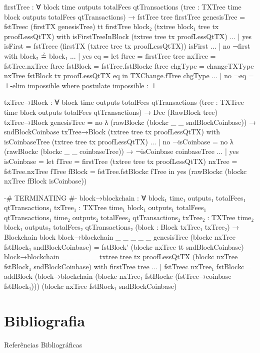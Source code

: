 \documentclass{beamer}
\begin{document}
\begin{code}
      firstTree : ∀
        {block time outputs totalFees qtTransactions}
        (tree : TXTree time block outputs totalFees qtTransactions)
        → fstTree tree
      firstTree genesisTree = fstTreec (firstTX genesisTree) tt
      firstTree {block₂} (txtree {block₁} tree tx proofLessQtTX)
        with isFirstTreeInBlock (txtree tree tx proofLessQtTX)
      ... | yes isFirst = fstTreec (firstTX (txtree tree tx proofLessQtTX)) isFirst
      ... | no ¬first with block₂ ≟ block₁
      ...   | yes eq = let ftree = firstTree tree
                           nxTree = fstTree.nxTree ftree
                           fstBlock = fstTree.fstBlockc ftree
                           chgType = changeTXType nxTree fstBlock tx proofLessQtTX eq
                       in TXChange.fTree chgType
      ...   | no ¬eq = ⊥-elim impossible
                where postulate impossible : ⊥

      txTree→Block : ∀
        {block time outputs totalFees qtTransactions}
        (tree : TXTree time block outputs totalFees qtTransactions)
        → Dec (RawBlock tree)
      txTree→Block genesisTree =
        no λ { (rawBlockc (blockc _ _ sndBlockCoinbase)) → sndBlockCoinbase }
      txTree→Block (txtree tree tx proofLessQtTX)
        with isCoinbaseTree (txtree tree tx proofLessQtTX)
      ... | no ¬isCoinbase =
              no λ{ (rawBlockc (blockc _ _ coinbaseTree)) → ¬isCoinbase coinbaseTree}
      ... | yes isCoinbase = let fTree = firstTree (txtree tree tx proofLessQtTX)
                                 nxTree = fstTree.nxTree fTree
                                 fBlock = fstTree.fstBlockc fTree
                             in yes (rawBlockc (blockc nxTree fBlock isCoinbase))

      {-# TERMINATING #-}
      block→blockchain : ∀
        {block₁ time₁ outputs₁ totalFees₁ qtTransactions₁}
        {txTree₁ : TXTree time₁ block₁ outputs₁ totalFees₁ qtTransactions₁}
        {time₂ outputs₂ totalFees₂ qtTransactions₂}
        {txTree₂ : TXTree time₂ block₁ outputs₂ totalFees₂ qtTransactions₂}
        (block : Block txTree₁ txTree₂)
        → Blockchain block
      block→blockchain {_} {_} {_} {_} {_} {genesisTree}
        (blockc nxTree fstBlock₁ sndBlockCoinbase) =
        fstBlock' (blockc nxTree tt sndBlockCoinbase)
      block→blockchain {_} {_} {_} {_} {_} {txtree tree tx proofLessQtTX}
        (blockc nxTree fstBlock₁ sndBlockCoinbase)
        with firstTree tree
      ... | fstTreec nxTree₁ fstBlockc = addBlock
        (block→blockchain (blockc nxTree₁ fstBlockc (fstTree→coinbase fstBlock₁)))
        (blockc nxTree fstBlock₁ sndBlockCoinbase)
\end{code}





\section{Bibliografia}

\begin{frame}{Referências Bibliográficas}
  
  
\end{frame}
\end{document}
